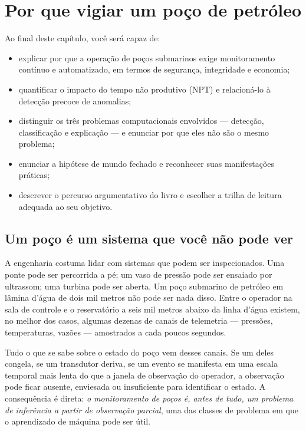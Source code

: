 \chapter{Por que vigiar um poço de petróleo}
\label{cap:introducao}

\begin{objetivos}
Ao final deste capítulo, você será capaz de:
\begin{itemize}[leftmargin=*,itemsep=0.2em]
  \item explicar por que a operação de poços submarinos exige monitoramento contínuo e
        automatizado, em termos de segurança, integridade e economia;
  \item quantificar o impacto do tempo não produtivo (NPT) e relacioná-lo à detecção
        precoce de anomalias;
  \item distinguir os três problemas computacionais envolvidos --- detecção,
        classificação e explicação --- e enunciar por que eles não são o mesmo problema;
  \item enunciar a hipótese de mundo fechado e reconhecer suas manifestações práticas;
  \item descrever o percurso argumentativo do livro e escolher a trilha de leitura
        adequada ao seu objetivo.
\end{itemize}
\end{objetivos}

\section{Um poço é um sistema que você não pode ver}

A engenharia costuma lidar com sistemas que podem ser inspecionados. Uma ponte pode
ser percorrida a pé; um vaso de pressão pode ser ensaiado por ultrassom; uma turbina
pode ser aberta. Um poço submarino de petróleo em lâmina d'água de dois mil metros não
pode ser nada disso. Entre o operador na sala de controle e o reservatório a seis mil
metros abaixo da linha d'água existem, no melhor dos casos, algumas dezenas de canais
de telemetria --- pressões, temperaturas, vazões --- amostrados a cada poucos segundos.

Tudo o que se sabe sobre o estado do poço vem desses canais. Se um deles congela, se
um transdutor deriva, se um evento se manifesta em uma escala temporal mais lenta do
que a janela de observação do operador, a observação pode ficar ausente, enviesada ou
insuficiente para identificar o estado. A
consequência é direta: \emph{o monitoramento de poços é, antes de tudo, um problema de
inferência a partir de observação parcial}, uma das classes de problema em que o
aprendizado de máquina pode ser útil.

